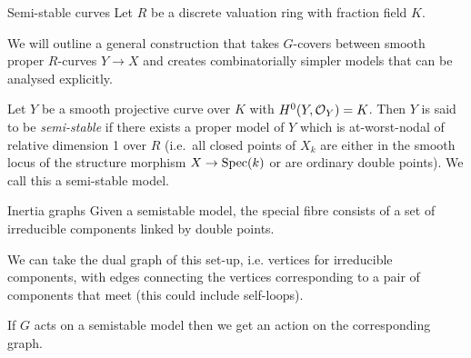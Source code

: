 \begin{frame}{Semi-stable curves}
    Let $R$ be a discrete valuation ring with fraction field $K$.

    We will outline a general construction that takes $G$-covers between smooth proper $R$-curves $Y \to X$ and creates combinatorially simpler models that can be analysed explicitly. \pause

    \begin{definition}
        Let $Y$ be a smooth projective curve over $K$ with $H^0(Y,\operatorname{\mathcal{O}}_Y)=K$. Then $Y$ is said to be \emph{semi-stable} if there exists a proper model of $Y$ which is at-worst-nodal of relative dimension 1 over $R$ (i.e.\ all closed points of $X_k$ are either in the smooth locus of the structure morphism $X\to\operatorname{Spec}(k)$ or are ordinary double points). We call this a semi-stable model.
    \end{definition}
\end{frame}

\begin{frame}{Inertia graphs}
    Given a semistable model, the special fibre consists of a set of irreducible components linked by double points.

    We can take the dual graph of this set-up, i.e. vertices for irreducible components, with edges connecting the vertices corresponding to a pair of components that meet (this could include self-loops).

    If $G$ acts on a semistable model then we get an action on the corresponding graph.
\end{frame}

